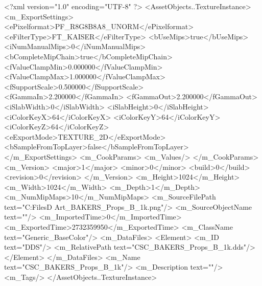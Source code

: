 <?xml version="1.0" encoding="UTF-8" ?>
<AssetObjects..TextureInstance>
	<m_ExportSettings>
		<ePixelformat>PF_R8G8B8A8_UNORM</ePixelformat>
		<eFilterType>FT_KAISER</eFilterType>
		<bUseMips>true</bUseMips>
		<iNumManualMips>0</iNumManualMips>
		<bCompleteMipChain>true</bCompleteMipChain>
		<fValueClampMin>0.000000</fValueClampMin>
		<fValueClampMax>1.000000</fValueClampMax>
		<fSupportScale>0.500000</fSupportScale>
		<fGammaIn>2.200000</fGammaIn>
		<fGammaOut>2.200000</fGammaOut>
		<iSlabWidth>0</iSlabWidth>
		<iSlabHeight>0</iSlabHeight>
		<iColorKeyX>64</iColorKeyX>
		<iColorKeyY>64</iColorKeyY>
		<iColorKeyZ>64</iColorKeyZ>
		<eExportMode>TEXTURE_2D</eExportMode>
		<bSampleFromTopLayer>false</bSampleFromTopLayer>
	</m_ExportSettings>
	<m_CookParams>
		<m_Values/>
	</m_CookParams>
	<m_Version>
		<major>1</major>
		<minor>0</minor>
		<build>0</build>
		<revision>0</revision>
	</m_Version>
	<m_Height>1024</m_Height>
	<m_Width>1024</m_Width>
	<m_Depth>1</m_Depth>
	<m_NumMipMaps>10</m_NumMipMaps>
	<m_SourceFilePath text="C:\Users\Shadow\Desktop\Working Files\3D Art\Textures\CSC_BAKERS_Props_B_1k.png"/>
	<m_SourceObjectName text=""/>
	<m_ImportedTime>0</m_ImportedTime>
	<m_ExportedTime>2732359950</m_ExportedTime>
	<m_ClassName text="Generic_BaseColor"/>
	<m_DataFiles>
		<Element>
			<m_ID text="DDS"/>
			<m_RelativePath text="CSC_BAKERS_Props_B_1k.dds"/>
		</Element>
	</m_DataFiles>
	<m_Name text="CSC_BAKERS_Props_B_1k"/>
	<m_Description text=""/>
	<m_Tags/>
</AssetObjects..TextureInstance>

